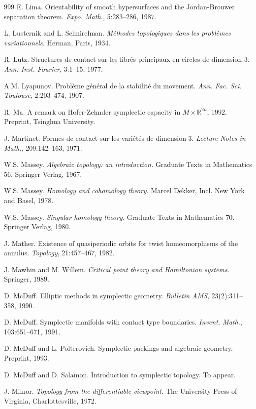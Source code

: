 \begin{thebibliography}{999}
 E. Lima. Orientability of smooth hypersurfaces and the
Jordan-Brouwer separation theorem. \emph{Expo. Math.}, 5:283--286, 1987.

 L. Lusternik and L. Schnirelman. \emph{Méthodes
topologiques dans les problèmes variationnels.} Herman, Paris, 1934.

 R. Lutz. Structures de contact sur les fibrés principaux
en circles de dimension 3. \emph{Ann. Inst. Fourier}, 3:1--15, 1977.

 A.M. Lyapunov. Problème général de la stabilité du
movement. \emph{Ann. Fac. Sci. Toulouse}, 2:203--474, 1907.

 R. Ma. A remark on Hofer-Zehnder symplectic capacity in
$M \times \mathbb{R}^{2n}$, 1992. Preprint, Tsinghua University.

 J. Martinet. Formes de contact sur les variétés de
dimension 3. \emph{Lecture Notes in Math.}, 209:142--163, 1971.

 W.S. Massey. \emph{Algebraic topology: an introduction.}
Graduate Texts in Mathematics 56. Springer Verlag, 1967.

 W.S. Massey. \emph{Homology and cohomology theory.}
Marcel Dekker, Incl. New York and Basel, 1978.

 W.S. Massey. \emph{Singular homology theory.} Graduate
Texts in Mathematics 70. Springer Verlag, 1980.

 J. Mather. Existence of quasiperiodic orbits for twist
homeomorphisms of the annulus. \emph{Topology}, 21:457--467, 1982.

 J. Mawhin and M. Willem. \emph{Critical point theory and
Hamiltonian systems.} Springer, 1989.

 D. McDuff. Elliptic methods in symplectic geometry.
\emph{Bulletin AMS}, 23(2):311--358, 1990.

 D. McDuff. Symplectic manifolds with contact type
boundaries. \emph{Invent. Math.}, 103:651--671, 1991.

 D. McDuff and L. Polterovich. Symplectic packings and
algebraic geometry. Preprint, 1993.

 D. McDuff and D. Salamon. Introduction to symplectic
topology. To appear.

 J. Milnor. \emph{Topology from the differentiable
viewpoint.} The University Press of Virginia, Charlottesville, 1972.


\end{thebibliography}
